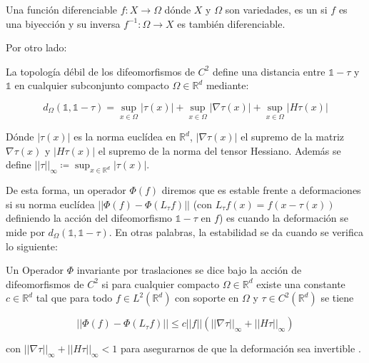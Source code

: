 \begin{definicion}
    Una función diferenciable $f: X \rightarrow \Omega$ dónde $X$ y $\Omega$ son variedades, es un  si $f$ es una biyección y su inversa $f^{-1}:\Omega \rightarrow X$ es también diferenciable. 
\end{definicion}

\noindent Por otro lado:

\begin{definicion}
    La topología débil de los difeomorfismos de $C^2$ define una distancia entre $\mathbb{1}-\tau$ y $\mathbb{1}$ en cualquier subconjunto compacto $\Omega \in  \mathbb{R}^d$ mediante: 
    
    $$d_\Omega(\mathbb{1},\mathbb{1}-\tau) = \sup_{x \in \Omega} |\tau (x)| + \sup_{x \in \Omega} |\nabla \tau (x)| + \sup_{x \in \Omega}|H \tau (x)|$$
\end{definicion}

\noindent Dónde $|\tau(x)|$ es la norma euclídea en $\mathbb{R}^d$, $|\nabla \tau (x)|$ el supremo de la matriz $\nabla \tau (x)$ y $|H \tau (x)|$ el supremo de la norma del tensor Hessiano. Además se define $||\tau||_{\infty}\coloneqq \sup_{x\in\mathbb{R}^d} |\tau(x)|$.

\medskip 

\noindent De esta forma, un operador $\Phi(f)$ diremos que es estable frente a deformaciones si su norma euclídea $\left|\left| \Phi(f) - \Phi(L_\tau f) \right| \right|$ (con $L_{\tau} f(x)=f(x-\tau(x))$ definiendo la acción del difeomorfismo $\mathbb{1}-\tau$ en $f$) es  cuando la deformación se mide por $d_\Omega(\mathbb{1},\mathbb{1}-\tau)$. En otras palabras, la estabilidad se da cuando se verifica lo siguiente: 

\begin{definicion}
    Un Operador $\Phi$ invariante por traslaciones  se dice  bajo la acción de difeomorfismos de $C^2$ si para cualquier compacto $\Omega \in \mathbb{R}^d$ existe una constante $c\in \mathbb{R}^d$ tal que para todo $f\in L^2(\mathbb{R}^d)$ con soporte en $\Omega$ y $\tau \in C^2(\mathbb{R}^d)$ se tiene
    
    $$\left|\left| \Phi(f) - \Phi(L_\tau f) \right| \right| \leq c ||f|| (||\nabla \tau ||_{\infty} + ||H\tau||_\infty)$$
    
    con  $|| \nabla \tau ||_\infty + ||H \tau ||_\infty < 1$ para asegurarnos de que la deformación sea invertible \cite{doi:10.1137/S0036141002404838}.
\end{definicion}

